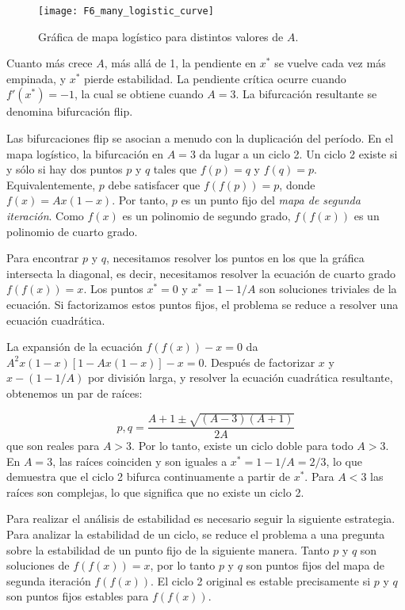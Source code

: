         \begin{figure}[hbtp]
            \caption{Gráfica de mapa logístico para distintos valores de $A$.}
            \centering
            \texttt{[image: F6\_many\_logistic\_curve]}
            \label{fig:F6_many_logistic_curve}
        \end{figure}
        
        Cuanto más crece $A$, más allá de 1, la pendiente en $x^{*}$ se vuelve cada vez más empinada, y $x^{*}$ pierde estabilidad. La pendiente crítica ocurre cuando $f'(x^{*}) = -1$, la cual se obtiene cuando $A = 3$. La bifurcación resultante se denomina bifurcación flip.

        Las bifurcaciones flip se asocian a menudo con la duplicación del período. En el mapa logístico, la bifurcación en $A = 3$ da lugar a un ciclo 2. Un ciclo 2 existe si y sólo si hay dos puntos $p$ y $q$ tales que $f(p) = q$  y $f(q) = p$. Equivalentemente, $p$ debe satisfacer que $f(f(p)) = p$, donde $f(x) = Ax (1 - x)$. Por tanto, $p$ es un punto fijo del \emph{mapa de segunda iteración}. Como $f(x)$ es un polinomio de segundo grado, $f(f(x))$ es un polinomio de cuarto grado.

        Para encontrar $p$ y $q$, necesitamos resolver los puntos en los que la gráfica intersecta la diagonal, es decir, necesitamos resolver la ecuación de cuarto grado $f(f(x)) = x$. Los puntos $x^{*} = 0$ y $x^{*} = 1 - 1/A$ son soluciones triviales de la ecuación. Si factorizamos estos puntos fijos, el problema se reduce a resolver una ecuación cuadrática. 

        La expansión de la ecuación $f(f(x)) -x = 0$ da $A^{2}x(1-x) [1 - Ax(1-x)] -x = 0$. Después de factorizar $x$ y $x - (1-1/A)$ por división larga, y resolver la ecuación cuadrática resultante, obtenemos un par de raíces:

        \begin{equation}
            p,q = \frac{A + 1 \pm \sqrt{(A-3) (A+1)} }{2A} 
        \end{equation}
        que son reales para $A > 3$. Por lo tanto, existe un ciclo doble para todo $ A > 3 $. En $ A = 3 $, las raíces coinciden y son iguales a $x^{*} = 1 - 1/A = 2/3$, lo que demuestra que el ciclo 2 bifurca continuamente a partir de $x^{*}$. Para $A < 3$ las raíces son complejas, lo que significa que no existe un ciclo 2.

         Para realizar el análisis de estabilidad es necesario seguir la siguiente estrategia. Para analizar la estabilidad de un ciclo, se reduce el problema a una pregunta sobre la estabilidad de un punto fijo de la siguiente manera. Tanto $p$ y $q$ son soluciones de $f(f(x)) = x$, por lo tanto $p$ y $q$ son puntos fijos del mapa de segunda iteración $f(f(x))$. El ciclo 2 original es estable precisamente si $p$ y $q$ son puntos fijos estables para $f(f(x))$.

